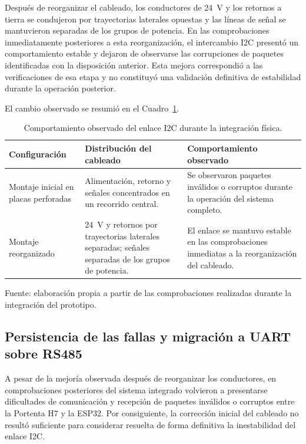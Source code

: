 Después de reorganizar el cableado, los conductores de 24~V y los retornos a tierra se condujeron por trayectorias laterales opuestas y las líneas de señal se mantuvieron separadas de los grupos de potencia. En las comprobaciones inmediatamente posteriores a esta reorganización, el intercambio I2C presentó un comportamiento estable y dejaron de observarse las corrupciones de paquetes identificadas con la disposición anterior. Esta mejora correspondió a las verificaciones de esa etapa y no constituyó una validación definitiva de estabilidad durante la operación posterior.

El cambio observado se resumió en el Cuadro~\ref{tab:fase4_cableado_i2c}.

\begin{table}[H]
    \centering
    \caption{Comportamiento observado del enlace I2C durante la integración física.}
    \label{tab:fase4_cableado_i2c}
    \begin{tabular}{p{}p{}p{}}
        \hline
        Configuración & Distribución del cableado & Comportamiento observado \\
        \hline

        Montaje inicial en placas perforadas &
        Alimentación, retorno y señales concentrados en un recorrido central. &
        Se observaron paquetes inválidos o corruptos durante la operación del sistema completo. \\

        Montaje reorganizado &
        24~V y retornos por trayectorias laterales separadas; señales separadas de los grupos de potencia. &
        El enlace se mantuvo estable en las comprobaciones inmediatas a la reorganización del cableado. \\

        \hline
    \end{tabular}

    \par\small\raggedright Fuente: elaboración propia a partir de las comprobaciones realizadas durante la integración del prototipo.
\end{table}


\subsection{Persistencia de las fallas y migración a UART sobre RS485}

A pesar de la mejoría observada después de reorganizar los conductores, en comprobaciones posteriores del sistema integrado volvieron a presentarse dificultades de comunicación y recepción de paquetes inválidos o corruptos entre la Portenta H7 y la ESP32. Por consiguiente, la corrección inicial del cableado no resultó suficiente para considerar resuelta de forma definitiva la inestabilidad del enlace I2C.

